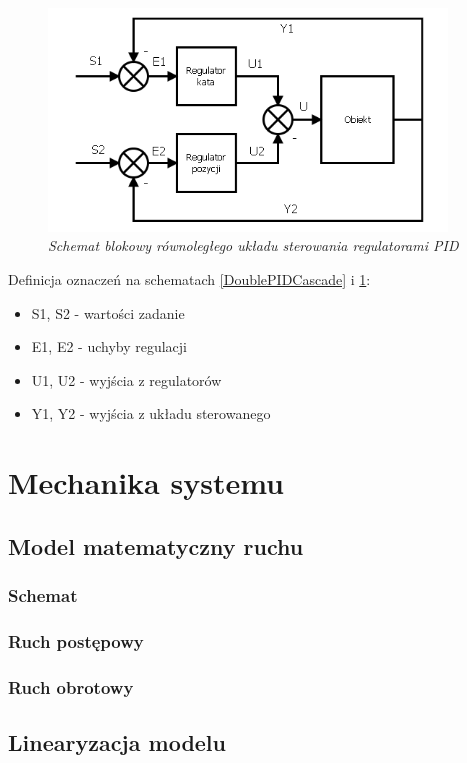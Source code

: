 \documentclass[12pt, oneside]{report}
\theoremstyle{definition}
\begin{document}
\begin{itemize}
\begin{figure}[H]
	\centering
		\includegraphics[width = 300pt]{DoublePIDParallel} 
		\caption{\textit{Schemat blokowy równoległego układu sterowania regulatorami PID\cite{LMIP}}}
		\label{DoublePIDParallel}
\end{figure}
\end{itemize}

Definicja oznaczeń na schematach \ref{DoublePIDCascade} i \ref{DoublePIDParallel}:
\begin{itemize}
\item S1, S2 - wartości zadanie
\item E1, E2 - uchyby regulacji
\item U1, U2 - wyjścia z regulatorów
\item Y1, Y2 - wyjścia z układu sterowanego
\end{itemize}  

\section{Mechanika systemu}
\subsection{Model matematyczny ruchu}
\subsubsection{Schemat}
\subsubsection{Ruch postępowy}
\subsubsection{Ruch obrotowy}
\subsection{Linearyzacja modelu}
\end{document}
